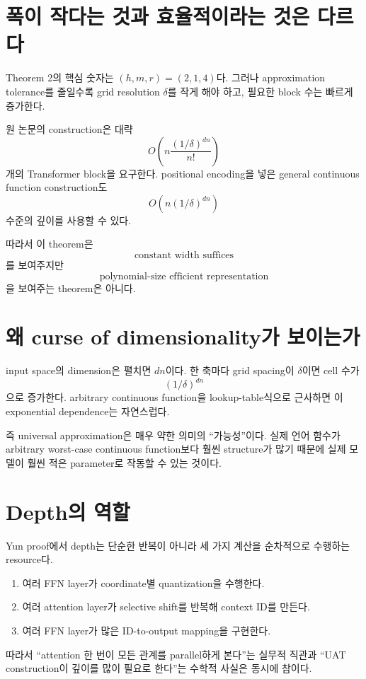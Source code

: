 \documentclass[11pt,a4paper,oneside,openany]{memoir}
\theoremstyle{definition}
\begin{document}
\section{폭이 작다는 것과 효율적이라는 것은 다르다}

Theorem 2의 핵심 숫자는 $(h,m,r)=(2,1,4)$다. 그러나 approximation tolerance를 줄일수록 grid resolution $\delta$를 작게 해야 하고,
필요한 block 수는 빠르게 증가한다.

원 논문의 construction은 대략
\[
O\!\left(
 n\frac{(1/\delta)^{dn}}{n!}
\right)
\]
개의 Transformer block을 요구한다. positional encoding을 넣은 general continuous function construction도
\[
O\!\left(n(1/\delta)^{dn}\right)
\]
수준의 깊이를 사용할 수 있다.

따라서 이 theorem은
\[
\text{constant width suffices}
\]
를 보여주지만
\[
\text{polynomial-size efficient representation}
\]
을 보여주는 theorem은 아니다.

\section{왜 curse of dimensionality가 보이는가}

input space의 dimension은 펼치면 $dn$이다. 한 축마다 grid spacing이 $\delta$이면 cell 수가
\[
(1/\delta)^{dn}
\]
으로 증가한다. arbitrary continuous function을 lookup-table식으로 근사하면 이 exponential dependence는 자연스럽다.

즉 universal approximation은 매우 약한 의미의 ``가능성''이다. 실제 언어 함수가 arbitrary worst-case continuous function보다 훨씬 structure가 많기 때문에
실제 모델이 훨씬 적은 parameter로 작동할 수 있는 것이다.

\section{Depth의 역할}

Yun proof에서 depth는 단순한 반복이 아니라 세 가지 계산을 순차적으로 수행하는 resource다.

\begin{enumerate}
  \item 여러 FFN layer가 coordinate별 quantization을 수행한다.
  \item 여러 attention layer가 selective shift를 반복해 context ID를 만든다.
  \item 여러 FFN layer가 많은 ID-to-output mapping을 구현한다.
\end{enumerate}

따라서 ``attention 한 번이 모든 관계를 parallel하게 본다''는 실무적 직관과
``UAT construction이 깊이를 많이 필요로 한다''는 수학적 사실은 동시에 참이다.
\end{document}
